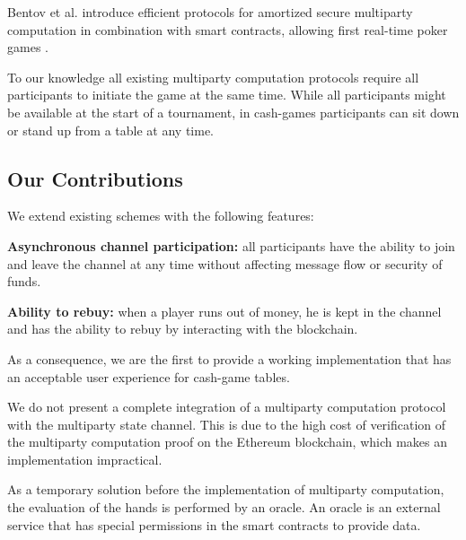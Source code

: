 Bentov et al. introduce efficient protocols for amortized secure multiparty computation in combination with smart contracts, allowing first real-time poker games \cite{bentov17}.

To our knowledge all existing multiparty computation protocols require all participants to initiate the game at the same time. While all participants might be available at the start of a tournament, in cash-games participants can sit down or stand up from a table at any time.

\subsection{Our Contributions}

We extend existing schemes with the following features:

\textbf{Asynchronous channel participation:} all participants have the ability to join and leave the channel at any time without affecting message flow or security of funds.

\textbf{Ability to rebuy:} when a player runs out of money, he is kept in the channel and has the ability to rebuy by interacting with the blockchain.

As a consequence, we are the first to provide a working implementation that has an acceptable user experience for cash-game tables.

We do not present a complete integration of a multiparty computation protocol with the multiparty state channel. This is due to the high cost of verification \cite{bentov17} of the multiparty computation proof on the Ethereum blockchain, which makes an implementation impractical.

As a temporary solution before the implementation of multiparty computation, the evaluation of the hands is performed by an oracle. An oracle is an external service that has special permissions in the smart contracts to provide data.
